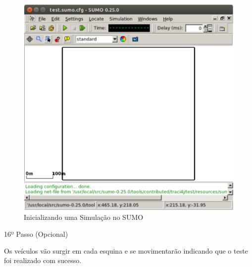 \documentclass[
12pt,				%
openright,			%
oneside,			%
a4paper,			%
brazil,				%
]{abntex2}
\begin{document}
{\begin{anexosenv}
                \begin{figure} [H]
	                \centering
	                \includegraphics[scale=.26]{figuras/aneB/54RodandoSimulacaoTeste}
	                \caption{\label{fig_54}Inicializando uma Simulação no SUMO}
                \end{figure}
                    
				\newpage
            	\begin{description}
	                \item[16º Passo (Opcional)]
	            \end{description}
	            \par Os veículos vão surgir em cada esquina e se movimentarão indicando que o teste foi realizado com sucesso.
		            

\end{anexosenv}}
\end{document}

